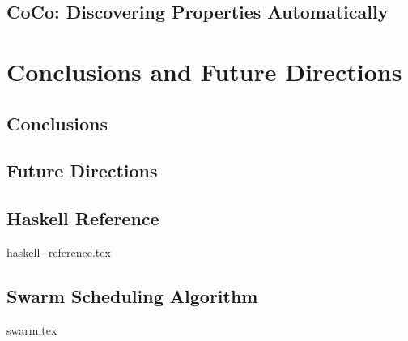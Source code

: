\documentclass[openright,imperial,11pt]{octavo}
\begin{document}
\chapter{CoCo: Discovering Properties Automatically}
\label{chp:coco}


\part{Conclusions and Future Directions}
\label{part:end}

\chapter{Conclusions}
\label{chp:conclusions}


\chapter{Future Directions}
\label{chp:future_work}


\begin{appendices}
\chapter{Haskell Reference}
\label{app:haskell}
{haskell_reference.tex}

\chapter{Swarm Scheduling Algorithm}
\label{app:swarm}
{swarm.tex}
\end{appendices}

\printbibliography[heading=bibintoc]
\end{document}
